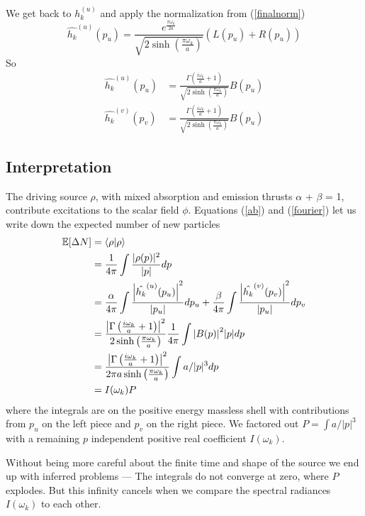 \documentclass[12pt,a4paper]{article}
\begin{document}
We get back to $h_k^{(u)}$ and apply the normalization from (\ref{finalnorm})
\[
\hat{h_k}^{(u)}(p_u) = \frac{e^{\frac{\pi \omega_k}{2a}}}{\sqrt{2 \sinh \left({\frac{\pi\omega_k}{a}}\right)}}  ( L(p_u) + R(p_u) )
\]
So
\begin{equation}
\label{fourier}
\begin{split}
\hat{h_k}^{(u)}(p_u) & = \frac{\Gamma\left(\frac{i\omega_k}{a} + 1\right)}{\sqrt{2 \sinh \left({\frac{\pi\omega_k}{a}}\right)}} B(p_u)\\
\hat{h_k}^{(v)}(p_v) &= \frac{\Gamma\left(\frac{i\omega_k}{a} + 1\right)}{\sqrt{2 \sinh \left({\frac{\pi\omega_k}{a}}\right)}} B(p_u)
\end{split}
\end{equation}
\subsection{Interpretation}
The driving source $\rho$, with mixed absorption and emission thrusts $\alpha$ + $\beta$ = 1, contribute excitations to the scalar field $\phi$. Equations (\ref{ab}) and (\ref{fourier}) let us write down the expected number of new particles
\begin{equation}  
  \label{number}
  \begin{split}
    \mathbb{E}[\Delta N] &= \braket{\rho|\rho} \\
    &= \frac{1}{4\pi} \int{\frac{|\rho(p)|^2}{|p|}dp} \\
    &= \frac{\alpha}{4\pi} \int{\frac{\left|\hat{h_k}^{(u)}(p_u)\right|^2}{|p_u|} dp_u} + \frac{\beta}{4\pi}\int{\frac{\left|\hat{h_k}^{(v)}(p_v)\right|^2}{|p_u|}dp_v} \\
    &= \frac{\left|\Gamma\left(\frac{i\omega_k}{a} + 1\right)\right|^2}{2 \sinh \left({\frac{\pi\omega_k}{a}}\right)} \frac{1}{4\pi} \int{{\left|B(p)\right|^2}{|p|} dp} \\
    &=  \frac{\left|\Gamma\left(\frac{i\omega_k}{a} + 1\right)\right|^2}{2 \pi a \sinh \left({\frac{\pi\omega_k}{a}}\right)} \int{a/|p|^3 dp}\\  
&=I(\omega_k) P
  \end{split}
\end{equation}
where the integrals are on the positive energy massless shell with contributions from $p_u$ on the left piece and $p_v$ on the right piece.  We factored out $P = \int{a/|p|^3}$ with a remaining $p$ independent positive real coefficient $I(\omega_k)$.

Without being more careful about the finite time and shape of the source we end up with inferred problems --- The integrals do not converge at zero, where $P$ explodes.  But this infinity cancels when we compare the spectral radiances $I(\omega_k)$ to each other.
\end{document}

